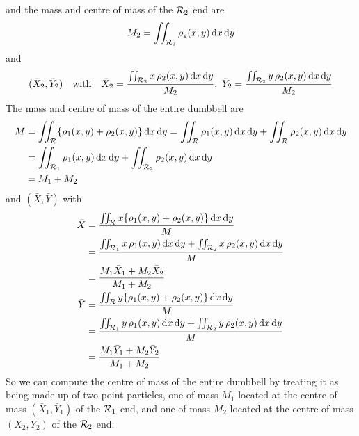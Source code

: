 \begin{eg}
\begin{equation*}
\end{equation*}
and the mass and centre of mass of the $\mathcal{R}_2$ end are
\begin{equation*}
M_2=\iint_{\mathcal{R}_2} \rho_2(x,y)\,\mathrm{d}x\,\mathrm{d}y
\end{equation*}
and
\begin{equation*}
(\bar X_2,\bar Y_2)\quad\text{with}\quad
\bar X_2 = \frac{\dblInt_{\cR_2} x\,\rho_2(x,y)\,\dee{x}\,\dee{y}}{M_2},\ 
\bar Y_2 = \frac{\dblInt_{\cR_2} y\,\rho_2(x,y)\,\dee{x}\,\dee{y}}{M_2}
\end{equation*}
The mass and centre of mass of the entire dumbbell are
\begin{align*}
M&= \iint_{\mathcal{R}} \{\rho_1(x,y)+\rho_2(x,y)\}\,\mathrm{d}x\,\mathrm{d}y
 = \iint_{\mathcal{R}} \rho_1(x,y)\,\mathrm{d}x\,\mathrm{d}y
      +\iint_{\mathcal{R}} \rho_2(x,y)\,\mathrm{d}x\,\mathrm{d}y \\
 &= \iint_{\mathcal{R}_1} \rho_1(x,y)\,\mathrm{d}x\,\mathrm{d}y
      +\iint_{\mathcal{R}_2} \rho_2(x,y)\,\mathrm{d}x\,\mathrm{d}y \\
 &=M_1+M_2
\end{align*}
and $(\bar X,\bar Y)$ with
\begin{align*}
\bar X &=\frac{\iint_{\mathcal{R}} 
                  x\{\rho_1(x,y)+\rho_2(x,y)\}\,\mathrm{d}x\,\mathrm{d}y}{M}\\
&=\frac{\iint_{\mathcal{R}_1} x\,\rho_1(x,y)\,\mathrm{d}x\,\mathrm{d}y
         +\iint_{\mathcal{R}_2} x\,\rho_2(x,y)\,\mathrm{d}x\,\mathrm{d}y}{M}\\
       &=\frac{M_1 \bar X_1 + M_2 \bar X_2}{M_1+M_2}
\\
\bar Y &=\frac{\iint_{\mathcal{R}} 
                  y\{\rho_1(x,y)+\rho_2(x,y)\}\,\mathrm{d}x\,\mathrm{d}y}{M}\\
&=\frac{\iint_{\mathcal{R}_1} y\,\rho_1(x,y)\,\mathrm{d}x\,\mathrm{d}y
         +\iint_{\mathcal{R}_2} y\,\rho_2(x,y)\,\mathrm{d}x\,\mathrm{d}y}{M}\\
       &=\frac{M_1 \bar Y_1 + M_2 \bar Y_2}{M_1+M_2}
\end{align*}
So we can compute the centre of mass of the entire dumbbell by treating
it as being made up of two point particles, one of mass $M_1$ located at
the centre of mass $(\bar X_1,\bar Y_1)$ of the $\mathcal{R}_1$ end, and one of mass 
$M_2$ located at the centre of mass $(X_2,Y_2)$ of the $\mathcal{R}_2$ end.
\end{eg}

